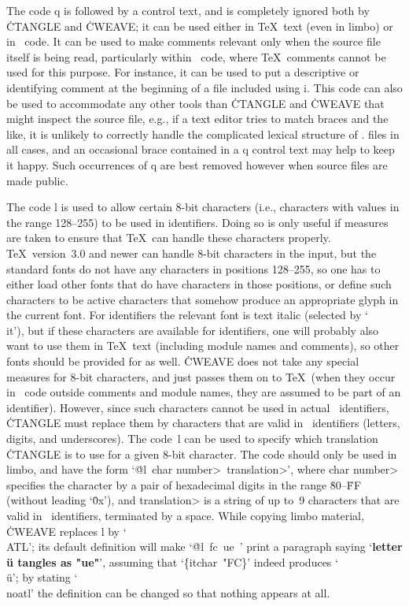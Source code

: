 The code \:q is followed by a control text, and is completely ignored both
by \.{CTANGLE} and \.{CWEAVE}; it can be used either in \TeX~text (even in
limbo) or in \Cee~code. It can be used to make comments relevant only when
the source file itself is being read, particularly within \Cee~code, where
\TeX~comments cannot be used for this purpose. For instance, it can be used
to put a descriptive or identifying comment at the beginning of a file
included using \:i. This code can also be used to accommodate any other
tools than \.{CTANGLE} and \.{CWEAVE} that might inspect the source file,
e.g., if a text editor tries to match braces and the like, it is unlikely to
correctly handle the complicated lexical structure of \CWEB. files in all
cases, and an occasional brace contained in a \:q control text may help to
keep it happy.  Such occurrences of \:q are best removed however when source
files are made public.

The code \:l is used to allow certain 8-bit characters (i.e., characters
with values in the range 128--255) to be used in identifiers. Doing so is
only useful if measures are taken to ensure that \TeX\ can handle these
characters properly. \TeX~version~3.0 and newer can handle 8-bit characters
in the input, but the standard fonts do not have any characters in positions
128--255, so one has to either load other fonts that do have characters in
those positions, or define such characters to be active characters that
somehow produce an appropriate glyph in the current font. For identifiers
the relevant font is text italic (selected by `\.{\\it}'), but if these
characters are available for identifiers, one will probably also want to use
them in \TeX~text (including module names and comments), so other fonts
should be provided for as well. \.{CWEAVE} does not take any special
measures for 8-bit characters, and just passes them on to \TeX\ (when they
occur in \Cee~code outside comments and module names, they are assumed to be
part of an identifier). However, since such characters cannot be used in
actual \Cee~identifiers, \.{CTANGLE} must replace them by characters that
are valid in \Cee~identifiers (letters, digits, and underscores). The
code~\:l can be used to specify which translation \.{CTANGLE} is to use for
a given 8-bit character. The code should only be used in limbo, and have the
form `\.{@l}~\<char number>~\<translation>', where \<char number> specifies
the character by a pair of hexadecimal digits in the range \.{80}--\.{FF}
(without leading `\.{0x}'), and \<translation> is a string of up to~9
characters that are valid in \Cee~identifiers, terminated by a space. While
copying limbo material, \.{CWEAVE} replaces \:l by `\.{\\ATL}'; its default
definition will make `\.{@l}~fc~ue~' print a paragraph saying `{\bf letter
\\{\"u} tangles as \tentex "ue"}', assuming that `\hbox{\.{\{\\it\\char
"FC\}}}' indeed produces `\\{\"u}'; by stating `\.{\\noatl}' the definition
can be changed so that nothing appears at all.

